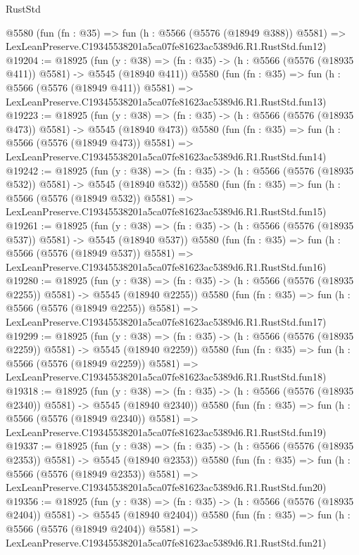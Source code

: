 \begin{lexlean}{RustStd}
\begin{coremodule}
    @5580
    (fun (fn : @35) =>
    fun (h : @5566 (@5576 (@18949 @388)) @5581) =>
    LexLeanPreserve.C19345538201a5ca07fe81623ac5389d6.R1.RustStd.fun12)
@19204 := @18925
    (fun (y : @38) => (fn : @35) -> (h : @5566 (@5576 (@18935 @411)) @5581) -> @5545 (@18940 @411))
    @5580
    (fun (fn : @35) =>
    fun (h : @5566 (@5576 (@18949 @411)) @5581) =>
    LexLeanPreserve.C19345538201a5ca07fe81623ac5389d6.R1.RustStd.fun13)
@19223 := @18925
    (fun (y : @38) => (fn : @35) -> (h : @5566 (@5576 (@18935 @473)) @5581) -> @5545 (@18940 @473))
    @5580
    (fun (fn : @35) =>
    fun (h : @5566 (@5576 (@18949 @473)) @5581) =>
    LexLeanPreserve.C19345538201a5ca07fe81623ac5389d6.R1.RustStd.fun14)
@19242 := @18925
    (fun (y : @38) => (fn : @35) -> (h : @5566 (@5576 (@18935 @532)) @5581) -> @5545 (@18940 @532))
    @5580
    (fun (fn : @35) =>
    fun (h : @5566 (@5576 (@18949 @532)) @5581) =>
    LexLeanPreserve.C19345538201a5ca07fe81623ac5389d6.R1.RustStd.fun15)
@19261 := @18925
    (fun (y : @38) => (fn : @35) -> (h : @5566 (@5576 (@18935 @537)) @5581) -> @5545 (@18940 @537))
    @5580
    (fun (fn : @35) =>
    fun (h : @5566 (@5576 (@18949 @537)) @5581) =>
    LexLeanPreserve.C19345538201a5ca07fe81623ac5389d6.R1.RustStd.fun16)
@19280 := @18925
    (fun (y : @38) =>
    (fn : @35) -> (h : @5566 (@5576 (@18935 @2255)) @5581) -> @5545 (@18940 @2255))
    @5580
    (fun (fn : @35) =>
    fun (h : @5566 (@5576 (@18949 @2255)) @5581) =>
    LexLeanPreserve.C19345538201a5ca07fe81623ac5389d6.R1.RustStd.fun17)
@19299 := @18925
    (fun (y : @38) =>
    (fn : @35) -> (h : @5566 (@5576 (@18935 @2259)) @5581) -> @5545 (@18940 @2259))
    @5580
    (fun (fn : @35) =>
    fun (h : @5566 (@5576 (@18949 @2259)) @5581) =>
    LexLeanPreserve.C19345538201a5ca07fe81623ac5389d6.R1.RustStd.fun18)
@19318 := @18925
    (fun (y : @38) =>
    (fn : @35) -> (h : @5566 (@5576 (@18935 @2340)) @5581) -> @5545 (@18940 @2340))
    @5580
    (fun (fn : @35) =>
    fun (h : @5566 (@5576 (@18949 @2340)) @5581) =>
    LexLeanPreserve.C19345538201a5ca07fe81623ac5389d6.R1.RustStd.fun19)
@19337 := @18925
    (fun (y : @38) =>
    (fn : @35) -> (h : @5566 (@5576 (@18935 @2353)) @5581) -> @5545 (@18940 @2353))
    @5580
    (fun (fn : @35) =>
    fun (h : @5566 (@5576 (@18949 @2353)) @5581) =>
    LexLeanPreserve.C19345538201a5ca07fe81623ac5389d6.R1.RustStd.fun20)
@19356 := @18925
    (fun (y : @38) =>
    (fn : @35) -> (h : @5566 (@5576 (@18935 @2404)) @5581) -> @5545 (@18940 @2404))
    @5580
    (fun (fn : @35) =>
    fun (h : @5566 (@5576 (@18949 @2404)) @5581) =>
    LexLeanPreserve.C19345538201a5ca07fe81623ac5389d6.R1.RustStd.fun21)

\end{coremodule}
\end{lexlean}
